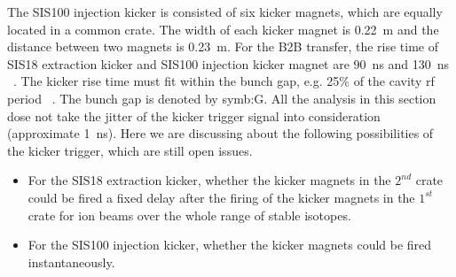 The SIS100 injection kicker is consisted of six kicker magnets, which are equally located in a common crate. The width of each kicker magnet is \SI{0.22}{m} and the distance between two magnets is \SI{0.23}{m}. For the B2B transfer, the rise time of SIS18 extraction kicker and SIS100 injection kicker magnet are \SI{90}{ns} and \SI{130}{ns} ~\cite{udo_detailed_2014}. The kicker rise time must fit within the bunch gap, e.g. 25$\%$ of the cavity rf period ~\cite{udo_injection_2014, liebermann_sis100_2013}. The bunch gap is denoted by \gls{symb:G}.  All the analysis in this section dose not take the jitter of the kicker trigger signal into consideration (approximate \SI{1}{ns}). Here we are discussing about the following possibilities of the kicker trigger, which are still open issues. 
\begin{itemize}
    \item For the SIS18 extraction kicker, whether the kicker magnets in the $2^{nd}$ crate could be fired a fixed delay after the firing of the kicker magnets in the $1^{st}$ crate for ion beams over the whole range of stable isotopes. 
    \item For the SIS100 injection kicker, whether the kicker magnets could be fired instantaneously. 
\end{itemize} 

